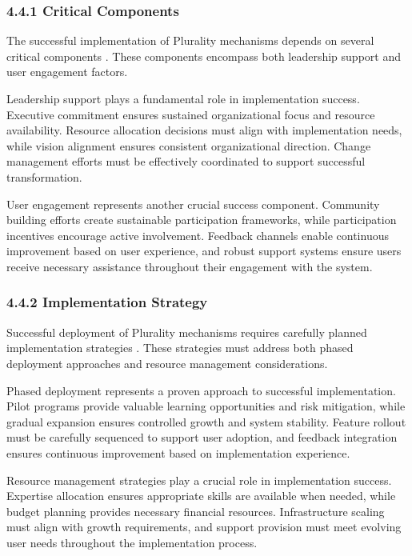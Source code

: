 \hypertarget{critical-components}{%
\subsubsection{4.4.1 Critical Components}\label{critical-components}}

The successful implementation of Plurality mechanisms depends on several critical components \citep{vtaiwan2023}. These components encompass both leadership support and user engagement factors.

Leadership support plays a fundamental role in implementation success. Executive commitment ensures sustained organizational focus and resource availability. Resource allocation decisions must align with implementation needs, while vision alignment ensures consistent organizational direction. Change management efforts must be effectively coordinated to support successful transformation.

User engagement represents another crucial success component. Community building efforts create sustainable participation frameworks, while participation incentives encourage active involvement. Feedback channels enable continuous improvement based on user experience, and robust support systems ensure users receive necessary assistance throughout their engagement with the system.

\hypertarget{implementation-strategy}{%
\subsubsection{4.4.2 Implementation Strategy}\label{implementation-strategy}}

Successful deployment of Plurality mechanisms requires carefully planned implementation strategies \citep{communitynotes2024}. These strategies must address both phased deployment approaches and resource management considerations.

Phased deployment represents a proven approach to successful implementation. Pilot programs provide valuable learning opportunities and risk mitigation, while gradual expansion ensures controlled growth and system stability. Feature rollout must be carefully sequenced to support user adoption, and feedback integration ensures continuous improvement based on implementation experience.

Resource management strategies play a crucial role in implementation success. Expertise allocation ensures appropriate skills are available when needed, while budget planning provides necessary financial resources. Infrastructure scaling must align with growth requirements, and support provision must meet evolving user needs throughout the implementation process.

